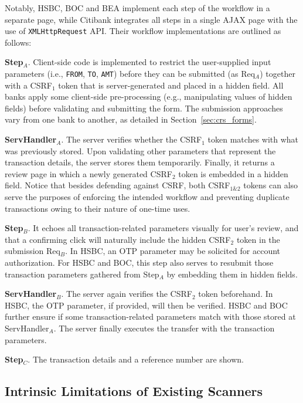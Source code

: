 \documentclass[letter]{sig-alternate-2013}
\begin{document}
Notably, HSBC, BOC and BEA implement each step of the workflow in a separate page, while Citibank integrates all steps in a single AJAX page with the use of \verb"XMLHttpRequest" API. Their workflow implementations are outlined as follows:

\textbf{Step$_A$}. Client-side code is implemented to restrict the user-supplied input parameters (i.e., \verb"FROM", \verb"TO", \verb"AMT") before they can be submitted (as Req$_A$) together with a CSRF$_1$ token that is server-generated and placed in a hidden field. All banks apply some client-side pre-processing (e.g., manipulating values of hidden fields) before validating and submitting the form. The submission approaches vary from one bank to another, as detailed in Section~\ref{sec:crs_forms}.

\textbf{ServHandler$_A$}. The server verifies whether the CSRF$_1$ token matches with what was previously stored. Upon validating other parameters that represent the transaction details, the server stores them temporarily. Finally, it returns a review page in which a newly generated CSRF$_2$ token is embedded in a hidden field. Notice that besides defending against CSRF, both CSRF$_{1\&2}$ tokens can also serve the purposes of enforcing the intended workflow and preventing duplicate transactions owing to their nature of one-time uses.

\textbf{Step$_B$}. It echoes all transaction-related parameters visually for user's review, and that a confirming click will naturally include the hidden CSRF$_2$ token in the submission Req$_B$. In HSBC, an OTP parameter may be solicited for account authorization. For HSBC and BOC, this step also serves to resubmit those transaction parameters gathered from Step$_A$ by embedding them in hidden fields.

\textbf{ServHandler$_B$}. The server again verifies the CSRF$_2$ token beforehand. In HSBC, the OTP parameter, if provided, will then be verified. HSBC and BOC further ensure if some transaction-related parameters match with those stored at ServHandler$_A$. The server finally executes the transfer with the transaction parameters.

\textbf{Step$_C$}. The transaction details and a reference number are shown.


\subsection{Intrinsic Limitations of Existing Scanners}
\end{document}
